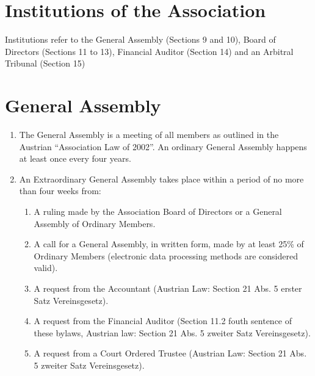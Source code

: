 \section{Institutions of the Association}

Institutions refer to the General Assembly (Sections 9 and 10), Board of Directors (Sections 11 to 13), Financial Auditor (Section 14) and an Arbitral Tribunal (Section 15)\\




\section{General Assembly}


\begin{enumerate}
\item The General Assembly is a meeting of all members as outlined in the Austrian “Association Law of 2002”. An ordinary General Assembly happens at least once every four years.
\item An Extraordinary General Assembly takes place within a period of no more than four weeks from:

\begin{enumerate}
\item A ruling made by the Association Board of Directors or a General Assembly of Ordinary Members.
\item A call for a General Assembly, in written form, made by at least 25\% of Ordinary Members (electronic data processing methods are considered valid).
\item A request from the Accountant (Austrian Law: Section 21 Abs. 5 erster Satz Vereinsgesetz).
\item A request from the Financial Auditor (Section 11.2 fouth sentence of these bylaws, Austrian law: Section 21 Abs. 5 zweiter Satz Vereinsgesetz).
\item A request from a Court Ordered Trustee (Austrian Law: Section 21 Abs. 5 zweiter Satz Vereinsgesetz).
\end{enumerate}


\end{enumerate}
